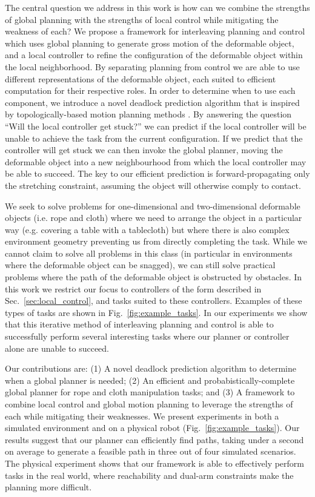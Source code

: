 The central question we address in this work is how can we combine the strengths of global planning with the strengths of local control while mitigating the weakness of each? We propose a framework for interleaving planning and control which uses global planning to generate gross motion of the deformable object, and a local controller to refine the configuration of the deformable object within the local neighborhood. By separating planning from control we are able to use different representations of the deformable object, each suited to efficient computation for their respective roles. In order to determine when to use each component, we introduce a novel deadlock prediction algorithm that is inspired by topologically-based motion planning methods \citep{Bhattacharya2012,Jaillet2008}. By answering the question ``Will the local controller get stuck?'' we can predict if the local controller will be unable to achieve the task from the current configuration. If we predict that the controller will get stuck we can then invoke the global planner, moving the deformable object into a new neighbourhood from which the local controller may be able to succeed. The key to our efficient prediction is forward-propagating only the stretching constraint, assuming the object will otherwise comply to contact.

We seek to solve problems for one-dimensional and two-dimensional deformable objects (i.e. rope and cloth) where we need to arrange the object in a particular way (e.g. covering a table with a tablecloth) but where there is also complex environment geometry preventing us from directly completing the task. While we cannot claim to solve all problems in this class (in particular in environments where the deformable object can be snagged), we can still solve practical problems where the path of the deformable object is obstructed by obstacles. In this work we restrict our focus to controllers of the form described in Sec.~\ref{sec:local_control}, and tasks suited to these controllers. Examples of these types of tasks are shown in Fig.~\ref{fig:example_tasks}. In our experiments we show that this iterative method of interleaving planning and control is able to successfully perform several interesting tasks where our planner or controller alone are unable to succeed.

Our contributions are: (1) A novel deadlock prediction algorithm to determine when a global planner is needed; (2) An efficient and probabistically-complete global planner for rope and cloth manipulation tasks; and (3) A framework to combine local control and global motion planning to leverage the strengths of each while mitigating their weaknesses. We present experiments in both a simulated environment and on a physical robot (Fig.~\ref{fig:example_tasks}). Our results suggest that our planner can efficiently find paths, taking under a second on average to generate a feasible path in three out of four simulated scenarios. The physical experiment shows that our framework is able to effectively perform tasks in the real world, where reachability and dual-arm constraints make the planning more difficult.

